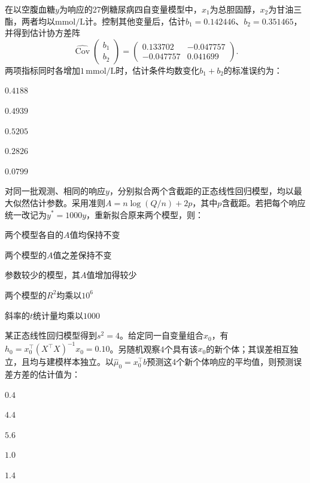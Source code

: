 \par\noindent\begin{minipage}{\linewidth}
在以空腹血糖$y$为响应的27例糖尿病四自变量模型中，$x_1$为总胆固醇，$x_2$为甘油三酯，两者均以$\mathrm{mmol/L}$计。控制其他变量后，估计$b_1=0.142446$、$b_2=0.351465$，并得到估计协方差阵\[\widehat{\operatorname{Cov}}\!\begin{pmatrix}b_1\\b_2\end{pmatrix}=\begin{pmatrix}0.133702&-0.047757\\-0.047757&0.041699\end{pmatrix}.\]两项指标同时各增加$1\,\mathrm{mmol/L}$时，估计条件均数变化$b_1+b_2$的标准误约为：
\begin{choices}
\item $0.4188$
\item $0.4939$
\item $0.5205$
\item $0.2826$
\item $0.0799$
\end{choices}
\end{minipage}\par\medskip

\par\noindent\begin{minipage}{\linewidth}
对同一批观测、相同的响应$y$，分别拟合两个含截距的正态线性回归模型，均以最大似然估计参数。采用准则$A=n\log(Q/n)+2p$，其中$p$含截距。若把每个响应统一改记为$y^*=1000y$，重新拟合原来两个模型，则：
\begin{choices}
\item 两个模型各自的$A$值均保持不变
\item 两个模型的$A$值之差保持不变
\item 参数较少的模型，其$A$值增加得较少
\item 两个模型的$R^2$均乘以$10^6$
\item 斜率的$t$统计量均乘以$1000$
\end{choices}
\end{minipage}\par\medskip

\par\noindent\begin{minipage}{\linewidth}
某正态线性回归模型得到$s^2=4$。给定同一自变量组合$x_0$，有$h_0=x_0^\top(X^\top X)^{-1}x_0=0.10$。另随机观察4个具有该$x_0$的新个体；其误差相互独立，且均与建模样本独立。以$\widehat\mu_0=x_0^\top b$预测这4个新个体响应的平均值，则预测误差方差的估计值为：
\begin{choices}
\item $0.4$
\item $4.4$
\item $5.6$
\item $1.0$
\item $1.4$
\end{choices}
\end{minipage}\par\medskip

